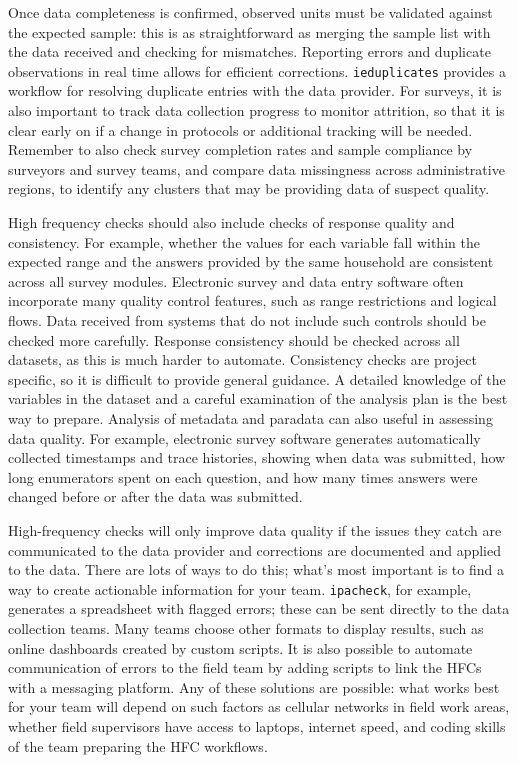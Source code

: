 Once data completeness is confirmed,
observed units must be validated against the expected sample:
this is as straightforward as merging the sample list
with the data received and checking for mismatches.
Reporting errors and duplicate observations in real time allows for efficient corrections.
\texttt{ieduplicates}
provides a workflow for resolving duplicate entries with the data provider.
For surveys, it is also important to track data collection progress to  monitor attrition,
so that it is clear early on if a change in protocols or additional tracking will be needed.
Remember to also check survey completion rates
and sample compliance by surveyors and survey teams,
and compare data missingness across administrative regions,
to identify any clusters that may be providing data of suspect quality.

High frequency checks should also include checks of response quality and consistency.
For example, whether the values for each variable fall within the expected range and
the answers provided by the same household are consistent across all survey modules.
Electronic survey and data entry software often incorporate many quality control features,
such as range restrictions and logical flows.
Data received from systems that do not include such controls should be checked more carefully.
Response consistency should be checked across all datasets, as this is much harder to automate.
Consistency checks are project specific, so it is difficult to provide general guidance.
A detailed knowledge of the variables in the dataset and a careful examination of the analysis plan
is the best way to prepare.
Analysis of metadata and paradata can also useful in assessing data quality.
For example, electronic survey software generates
automatically collected timestamps and trace histories,
showing when data was submitted, how long enumerators spent on each question,
and how many times answers were changed before or after the data was submitted.

High-frequency checks will only improve data quality
if the issues they catch are communicated to the data provider
and corrections are documented and applied to the data.
There are lots of ways to do this;
what's most important is to find a way to create actionable information for your team.
\texttt{ipacheck}, for example, generates a spreadsheet with flagged errors;
these can be sent directly to the data collection teams.
Many teams choose other formats to display results,
such as online dashboards created by custom scripts.
It is also possible to automate communication of errors to the field team
by adding scripts to link the HFCs with a messaging platform.
Any of these solutions are possible:
what works best for your team will depend on such factors as
cellular networks in field work areas, whether field supervisors have access to laptops,
internet speed, and coding skills of the team preparing the HFC workflows.

